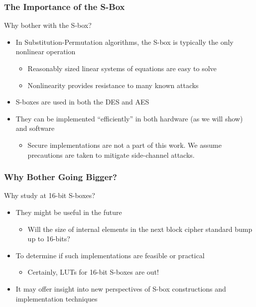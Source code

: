 \documentclass[handout,10pt]{beamer}
\begin{document}
\begin{frame}
	\frametitle{The Importance of the S-Box}
	Why bother with the S-box?
	\begin{itemize}
		\item In Substitution-Permutation algorithms, the S-box is typically the only nonlinear operation
		\begin{itemize}
			\item Reasonably sized linear systems of equations are easy to solve
			\item Nonlinearity provides resistance to many known attacks
		\end{itemize}
		\pause
		\item S-boxes are used in both the DES and AES
		\pause
		\item They can be implemented ``efficiently'' in both hardware (as we will show) and software
		\begin{itemize}
			\item Secure implementations are not a part of this work. We assume precautions are taken to mitigate side-channel attacks.
		\end{itemize}
	\end{itemize}
\end{frame}

\begin{frame}
	\frametitle{Why Bother Going Bigger?}
	Why study at 16-bit S-boxes?
	\begin{itemize}
		\item They might be useful in the future
		\begin{itemize}
			\item Will the size of internal elements in the next block cipher standard bump up to 16-bits?
		\end{itemize}
		\pause
		\item To determine if such implementations are feasible or practical
		\begin{itemize}
			\item Certainly, LUTs for 16-bit S-boxes are out!
		\end{itemize}
		\pause
		\item It may offer insight into new perspectives of S-box constructions and implementation techniques
	\end{itemize}
\end{frame}
\end{document}
